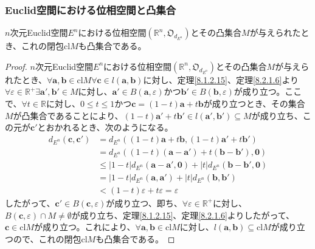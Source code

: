 \documentclass[dvipdfmx]{jsarticle}
\begin{document}
\subsubsection{Euclid空間における位相空間と凸集合}%
\begin{thm}\label{8.2.2.29}
$n$次元Euclid空間$E^{n}$における位相空間$\left( \mathbb{R}^{n},\mathfrak{O}_{d_{E^{n}}} \right)$とその凸集合$M$が与えられたとき、これの閉包${\mathrm{cl}}M$も凸集合である。
\end{thm}
\begin{proof}
$n$次元Euclid空間$E^{n}$における位相空間$\left( \mathbb{R}^{n},\mathfrak{O}_{d_{E^{n}}} \right)$とその凸集合$M$が与えられたとき、$\forall\mathbf{a},\mathbf{b} \in {\mathrm{cl}}M\forall\mathbf{c} \in l\left( \mathbf{a},\mathbf{b} \right)$に対し、定理\ref{8.1.2.15}、定理\ref{8.2.1.6}より$\forall\varepsilon \in \mathbb{R}^{+}\exists\mathbf{a}',\mathbf{b}' \in M$に対し、$\mathbf{a}' \in B\left( \mathbf{a},\varepsilon \right)$かつ$\mathbf{b}' \in B\left( \mathbf{b},\varepsilon \right)$が成り立つ。ここで、$\forall t \in \mathbb{R}$に対し、$0 \leq t \leq 1$かつ$\mathbf{c} = (1 - t)\mathbf{a} + t\mathbf{b}$が成り立つとき、その集合$M$が凸集合であることにより、$(1 - t)\mathbf{a}' + t\mathbf{b}' \in l\left( \mathbf{a}',\mathbf{b}' \right) \subseteq M$が成り立ち、この元が$\mathbf{c}'$とおかれるとき、次のようになる。
\begin{align*}
d_{E^{n}}\left( \mathbf{c},\mathbf{c}' \right) &= d_{E^{n}}\left( (1 - t)\mathbf{a} + t\mathbf{b},(1 - t)\mathbf{a}' + t\mathbf{b}' \right)\\
&= d_{E^{n}}\left( (1 - t)\left( \mathbf{a} - \mathbf{a}' \right) + t\left( \mathbf{b} - \mathbf{b}' \right),\mathbf{0} \right)\\
&\leq |1 - t|d_{E^{n}}\left( \mathbf{a} - \mathbf{a}',\mathbf{0} \right) + |t|d_{E^{n}}\left( \mathbf{b} - \mathbf{b}',\mathbf{0} \right)\\
&= |1 - t|d_{E^{n}}\left( \mathbf{a},\mathbf{a}' \right) + |t|d_{E^{n}}\left( \mathbf{b},\mathbf{b}' \right)\\
&< (1 - t)\varepsilon + t\varepsilon = \varepsilon
\end{align*}
したがって、$\mathbf{c}' \in B\left( \mathbf{c},\varepsilon \right)$が成り立つ、即ち、$\forall\varepsilon \in \mathbb{R}^{+}$に対し、$B\left( \mathbf{c},\varepsilon \right) \cap M \neq \emptyset$が成り立ち、定理\ref{8.1.2.15}、定理\ref{8.2.1.6}よりしたがって、$\mathbf{c} \in {\mathrm{cl}}M$が成り立つ。これにより、$\forall\mathbf{a},\mathbf{b} \in {\mathrm{cl}}M$に対し、$l\left( \mathbf{a},\mathbf{b} \right) \subseteq {\mathrm{cl}}M$が成り立つので、これの閉包${\mathrm{cl}}M$も凸集合である。
\end{proof}
\end{document}
